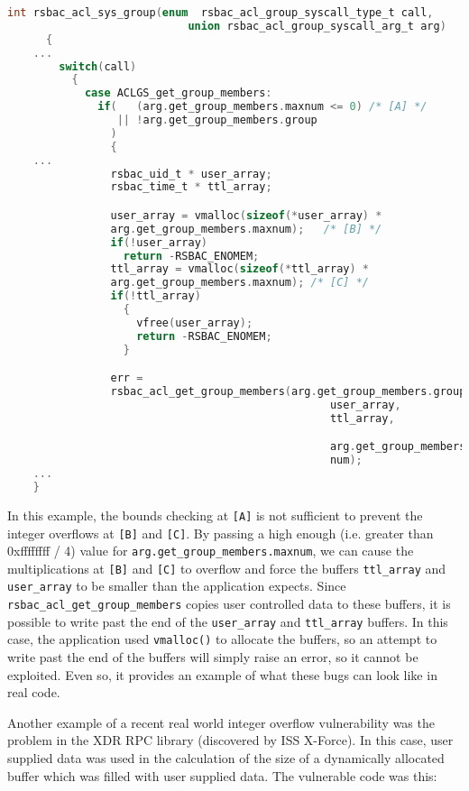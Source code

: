 \documentclass{iacrtrans}
\begin{document}
\begin{lstlisting}[language=c]
    int rsbac_acl_sys_group(enum  rsbac_acl_group_syscall_type_t call,
                            union rsbac_acl_group_syscall_arg_t arg)
      {
    ...
        switch(call)
          {
            case ACLGS_get_group_members:
              if(   (arg.get_group_members.maxnum <= 0) /* [A] */
                 || !arg.get_group_members.group
                )
                {
    ...
                rsbac_uid_t * user_array;
                rsbac_time_t * ttl_array;

                user_array = vmalloc(sizeof(*user_array) *
                arg.get_group_members.maxnum);   /* [B] */
                if(!user_array)
                  return -RSBAC_ENOMEM;
                ttl_array = vmalloc(sizeof(*ttl_array) *
                arg.get_group_members.maxnum); /* [C] */
                if(!ttl_array)
                  {
                    vfree(user_array);
                    return -RSBAC_ENOMEM;
                  }

                err =
                rsbac_acl_get_group_members(arg.get_group_members.group,
                                                  user_array,
                                                  ttl_array,

                                                  arg.get_group_members.max
                                                  num);
    ...
    }
\end{lstlisting}

In this example, the bounds checking at \texttt{[A]} is not sufficient to prevent
the integer overflows at \texttt{[B]} and \texttt{[C]}.  By passing a high enough (i.e.
greater than 0xffffffff / 4) value for \texttt{arg.get\_group\_members.maxnum}, we
can cause the multiplications at \texttt{[B]} and \texttt{[C]} to overflow and force the
buffers \texttt{ttl\_array} and \texttt{user\_array} to be smaller than the application
expects.  Since \texttt{rsbac\_acl\_get\_group\_members} copies user controlled data
to these buffers, it is possible to write past the end of the \texttt{user\_array}
and \texttt{ttl\_array} buffers. In this case, the application used \texttt{vmalloc()} to
allocate the buffers, so an attempt to write past the end of the buffers
will simply raise an error, so it cannot be exploited.  Even so, it
provides an example of what these bugs can look like in real code.

Another example of a recent real world integer overflow vulnerability
was the problem in the XDR RPC library (discovered by ISS X-Force). In this
case, user supplied data was used in the calculation of the size of a
dynamically allocated buffer which was filled with user supplied data.  The
vulnerable code was this:
\end{document}
